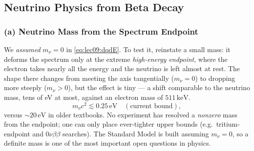 
\subsection{Neutrino Physics from Beta Decay}
\label{subsec:lec09:neutrinos}

\subsubsection*{(a) Neutrino Mass from the Spectrum Endpoint}
We \emph{assumed} $m_\nu=0$ in \eqref{eq:lec09:dqdE}. To test it, reinstate a
small mass: it deforms the spectrum only at the extreme \emph{high-energy
endpoint}, where the electron takes nearly all the energy and the neutrino is
left almost at rest. The shape there changes from meeting the axis tangentially
($m_\nu=0$) to dropping more steeply ($m_\nu>0$), but the effect is tiny --- a
shift comparable to the neutrino mass, tens of eV at most, against an electron
mass of $511\,\text{keV}$.
\begin{equation}
  \label{eq:lec09:nu_mass_bound}
  \boxed{m_{\nu}c^2 \lesssim 0.25\,\text{eV}\quad(\text{current bound}),}
\end{equation}
versus $\sim20\,\text{eV}$ in older textbooks. No experiment has resolved a
\emph{nonzero} mass from the endpoint; one can only place ever-tighter upper
bounds (e.g.\ tritium-endpoint and $0\nu\beta\beta$ searches). The Standard Model
is built assuming $m_\nu=0$, so a definite mass is one of the most important open
questions in physics.


